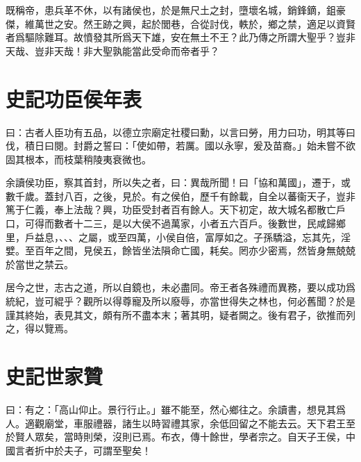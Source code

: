 既稱帝，患兵革不休，以有諸侯也，於是無尺土之封，墮壞名城，銷鋒鏑，鉏豪傑，維萬世之安。然王跡之興，起於閭巷，合從討伐，軼於，鄉之禁，適足以資賢者爲驅除難耳。故憤發其所爲天下雄，安在無土不王？此乃傳之所謂大聖乎？豈非天哉、豈非天哉！非大聖孰能當此受命而帝者乎？

\section[高祖功臣侯年表\quad{\small 史記}]{{\normalsize 史記}\quad{}功臣侯年表}
曰：古者人臣功有五品，以德立宗廟定社稷曰勳，以言曰勞，用力曰功，明其等曰伐，積日曰閱。封爵之誓曰：「使如帶，若厲。國以永寧，爰及苗裔。」始未嘗不欲固其根本，而枝葉稍陵夷衰微也。

余讀侯功臣，察其首封，所以失之者，曰：異哉所聞！曰「協和萬國」，遷于，或數千歲。蓋封八百，之後，見於。有之侯伯，歷千有餘載，自全以蕃衞天子，豈非篤于仁義，奉上法哉？興，功臣受封者百有餘人。天下初定，故大城名都散亡戶口，可得而數者十二三，是以大侯不過萬家，小者五六百戶。後數世，民咸歸鄉里，戶益息，、、、之屬，或至四萬，小侯自倍，富厚如之。子孫驕溢，忘其先，淫嬖。至百年之間，見侯五，餘皆坐法隕命亡國，耗矣。罔亦少密焉，然皆身無兢兢於當世之禁云。

居今之世，志古之道，所以自鏡也，未必盡同。帝王者各殊禮而異務，要以成功爲統紀，豈可緄乎？觀所以得尊寵及所以廢辱，亦當世得失之林也，何必舊聞？於是謹其終始，表見其文，頗有所不盡本末；著其明，疑者闕之。後有君子，欲推而列之，得以覽焉。

\section[孔子世家贊\quad{\small 史記}]{{\normalsize 史記}\quad{}世家贊}
曰：有之：「高山仰止。景行行止。」雖不能至，然心鄉往之。余讀書，想見其爲人。適觀廟堂，車服禮器，諸生以時習禮其家，余低回留之不能去云。天下君王至於賢人眾矣，當時則榮，沒則已焉。布衣，傳十餘世，學者宗之。自天子王侯，中國言者折中於夫子，可謂至聖矣！

